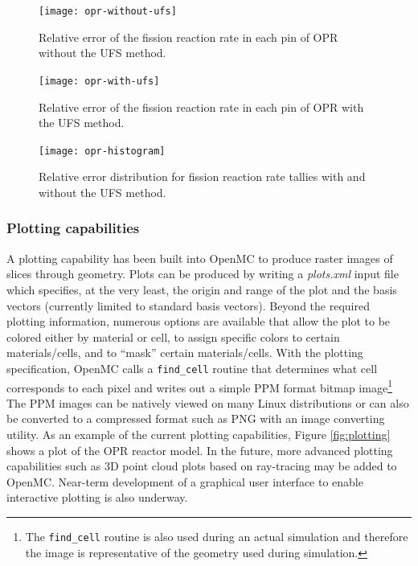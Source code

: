 \documentclass{ansconf}
\begin{document}
\begin{figure}[!htb]
  \begin{minipage}{0.45\textwidth}
    \centering
    \texttt{[image: opr-without-ufs]}
    \caption{Relative error of the fission reaction rate in each pin of OPR
      without the UFS method.}
    \label{fig:without-ufs}
  \end{minipage}
  \hspace{0.1\textwidth}
  \begin{minipage}{0.45\textwidth}
    \centering
    \texttt{[image: opr-with-ufs]}
    \caption{Relative error of the fission reaction rate in each pin of OPR with
      the UFS method.}
    \label{fig:with-ufs}
  \end{minipage}
\end{figure}

\begin{figure}[!htb]
  \centering
  \texttt{[image: opr-histogram]}
  \caption{Relative error distribution for fission reaction rate tallies with
    and without the UFS method.}
  \label{fig:histogram}
\end{figure}

\subsubsection{Plotting capabilities}

A plotting capability has been built into OpenMC to produce raster images of
slices through geometry. Plots can be produced by writing a \emph{plots.xml}
input file which specifies, at the very least, the origin and range of the plot
and the basis vectors (currently limited to standard basis vectors). Beyond the
required plotting information, numerous options are available that allow the
plot to be colored either by material or cell, to assign specific colors to
certain materials/cells, and to ``mask'' certain materials/cells. With the
plotting specification, OpenMC calls a \texttt{find\_cell} routine that
determines what cell corresponds to each pixel and writes out a simple PPM
format bitmap image\footnote{The \texttt{find\_cell} routine is also used during
  an actual simulation and therefore the image is representative of the geometry
  used during simulation.} The PPM images can be natively viewed on many Linux
distributions or can also be converted to a compressed format such as PNG with
an image converting utility. As an example of the current plotting capabilities,
Figure \ref{fig:plotting} shows a plot of the OPR reactor model. In the future,
more advanced plotting capabilities such as 3D point cloud plots based on
ray-tracing may be added to OpenMC. Near-term development of a graphical user
interface to enable interactive plotting is also underway.
\end{document}
